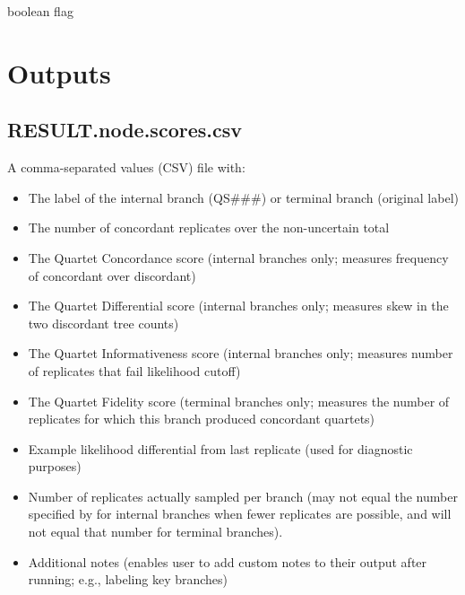 \documentclass[letterpaper,12pt,english]{sphinxmanual}
\begin{document}
 boolean flag


\chapter{Outputs}
\label{\detokenize{output:outputs}}\label{\detokenize{output:output}}\label{\detokenize{output::doc}}

\section{RESULT.node.scores.csv}
\label{\detokenize{output:result-node-scores-csv}}
A comma-separated values (CSV) file with:
\begin{itemize}
\item {} 
 The label of the internal branch (QS\#\#\#) or terminal branch (original label)

\item {} 
 The number of concordant replicates over the non-uncertain total

\item {} 
 The Quartet Concordance score (internal branches only; measures frequency of concordant over discordant)

\item {} 
 The Quartet Differential score (internal branches only; measures skew in the two discordant tree counts)

\item {} 
 The Quartet Informativeness score (internal branches only; measures number of replicates that fail likelihood cutoff)

\item {} 
 The Quartet Fidelity score (terminal branches only; measures the number of replicates for which this branch produced concordant quartets)

\item {} 
 Example likelihood differential from last replicate (used for diagnostic purposes)

\item {} 
 Number of replicates actually sampled per branch (may not equal the number specified by  for internal branches when fewer replicates are possible, and will not equal that number for terminal branches).

\item {} 
 Additional notes (enables user to add custom notes to their output after running; e.g., labeling key branches)

\end{itemize}
\end{document}
